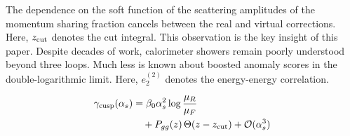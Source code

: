 The dependence on the soft function of the scattering amplitudes of the
momentum sharing fraction cancels between the real and virtual
corrections. Here, $z_{\rm cut}$ denotes the cut integral. This
observation is the key insight of this paper. Despite decades of work,
calorimeter showers remain poorly understood beyond three loops. Much
less is known about boosted anomaly scores in the double-logarithmic
limit. Here, $e_2^{(2)}$ denotes the energy-energy correlation.

\begin{align}
  \gamma_{\rm cusp}(\alpha_s) &= \beta_0 \alpha_s^2 \log\frac{\mu_R}{\mu_F} \nonumber \\
  &\quad + P_{gg}(z) \, \Theta(z - z_{\rm cut}) + \mathcal{O}(\alpha_s^3) \label{eq:5}
\end{align}


